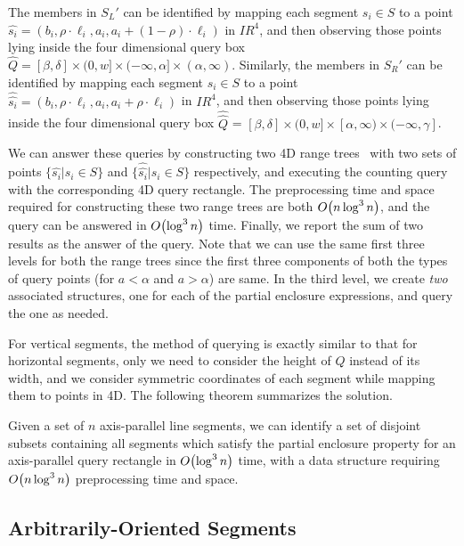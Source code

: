 The members in $S_L'$ can be identified by mapping each 
segment $s_i\in S$ to a point $\hat{s_i}=(b_i,\rho\cdot\ell_i,
a_i,a_i + (1-\rho) \cdot\ell_i)$ in $I\!\!R^4$, and then observing  
those points lying inside the  four dimensional query box 
$\hat{Q}=[\beta, \delta] \times (0,w] \times (-\infty,\alpha] \times 
(\alpha,\infty)$. 
Similarly, the members in $S_R'$ can be identified 
by mapping each segment $s_i\in S$ to a point 
$\hat{\hat{s_i}}=(b_i,\rho\cdot\ell_i,a_i,a_i + \rho 
\cdot\ell_i)$ in $I\!\!R^4$, and then observing  
those points lying inside the  four dimensional query box 
$\hat{\hat{Q}}$ = $[\beta, \delta] \times (0, w] \times [\alpha, \infty) 
\times (-\infty, \gamma]$.

We can answer these queries by constructing two 4D range 
trees~\cite{Deberg} with two sets of points 
$\{\hat{s_i}|s_i \in S\}$ and 
$\{\hat{\hat{s_i}}|s_i \in S\}$ respectively, and 
executing the counting query with the corresponding 4D query 
rectangle. The preprocessing time and space required for 
constructing these two range trees are both $O\!\left(n \log^3{n}\right)$, 
and the query can be answered in $O\!\left(\log^3{n}\right)$ time. Finally, 
we report the sum of two results as the answer of the query. 
Note that we can use the same first three levels for both the 
range trees since the first three components of both the types 
of query points (for $a<\alpha$ and $a > \alpha$) are same. In the  
third level, we create \emph{two} associated structures, one for 
each of the partial enclosure expressions, and query the one as 
needed. 

For vertical segments, the method of querying is exactly similar 
to that for horizontal segments, only we need to consider the 
height of $Q$ instead of its width, and we consider symmetric 
coordinates of each segment while mapping them to points in 4D. 
The following theorem summarizes the solution.

\begin{theorem}
\label{th:ap}
Given a set of $n$ axis-parallel line segments, we can identify a 
set of disjoint subsets containing all segments which satisfy the partial 
enclosure property for an axis-parallel query rectangle in $O\!\left(\log^3{n}\right)$ 
time,
with a data structure requiring $O\!\left(n\log^3{n}\right)$ preprocessing time and 
space.
\end{theorem}

\subsection{Arbitrarily-Oriented Segments}
\label{:rectangles:ao}

